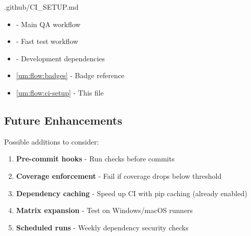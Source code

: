 \begin{relocated}{.github/CI_SETUP.md}
\begin{itemize}
\tightlist
\item
   - Main QA workflow
\item
   - Fast test workflow
\item
   - Development dependencies
\item
  \cref{um:flow:badges} - Badge reference
\item
  \cref{um:flow:ci-setup} - This file
\end{itemize}

\subsection{Future Enhancements}\label{um:flow:ci-setup:future-enhancements}

Possible additions to consider:

\begin{enumerate}
\def\labelenumi{\arabic{enumi}.}
\tightlist
\item
  \textbf{Pre-commit hooks} - Run checks before commits
\item
  \textbf{Coverage enforcement} - Fail if coverage drops below threshold
\item
  \textbf{Dependency caching} - Speed up CI with pip caching (already
  enabled)
\item
  \textbf{Matrix expansion} - Test on Windows/\allowbreak{}macOS runners
\item
  \textbf{Scheduled runs} - Weekly dependency security checks
\end{enumerate}
\end{relocated}

